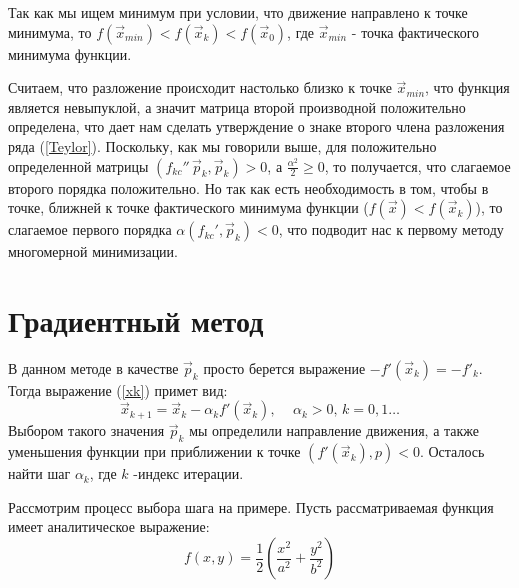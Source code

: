 Так как мы ищем минимум при условии, что движение направлено к точке минимума, то $f(\vec x_{min}) < f(\vec x_k) < f(\vec x_0)$, где $\vec x_{min}$ - точка фактического минимума функции. 

Считаем, что разложение происходит настолько близко к точке $\vec x_{min}$, что функция является невыпуклой, а значит матрица второй производной положительно определена, что дает нам сделать утверждение о знаке второго члена разложения ряда (\ref{Teylor}). Поскольку, как мы говорили выше, для положительно определенной матрицы $\left(f_{kc}'' \, \vec p_k,\vec p_k\right) > 0$, а $\frac{\alpha^2}{2} \geqslant 0$, то получается, что слагаемое второго порядка положительно. Но так как есть необходимость в том, чтобы в точке, ближней к точке фактического минимума функции ($f(\vec x) < f(\vec x_k)$), то слагаемое первого порядка $\alpha(f_{kc}',\vec p_k) < 0$, что подводит нас к первому методу многомерной минимизации.

\section{Градиентный метод}
В данном методе в качестве $\vec p_k$ просто берется выражение $-f'(\vec x_k) = -f'_k$. Тогда выражение (\ref{xk}) примет вид:
\begin{equation}
    \vec x_{k+1} = \vec x_k - \alpha_k f'(\vec x_k) \textbf{, } \quad \alpha_k > 0 \text{, } k = 0, 1 \ldots
\end{equation}
Выбором такого значения $\vec p_k$ мы определили направление движения, а также уменьшения функции при приближении к точке $(f'(\vec x_k), p) < 0$. Осталось найти шаг $\alpha_k$, где $k$ -индекс итерации.

Рассмотрим процесс выбора шага на примере.
Пусть рассматриваемая функция имеет аналитическое выражение:\
\begin{equation}
    f(x,y) = \frac12\left(\frac{x^2}{a^2} + \frac{y^2}{b^2}\right)
\end{equation}
